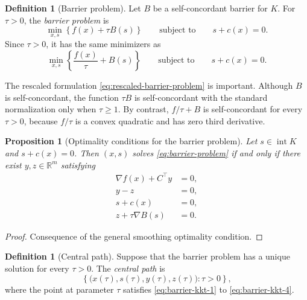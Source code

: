 \documentclass[a4paper,11pt]{book}
\theoremstyle{plain}
\newtheorem{proposition}[theorem]{Proposition}
\theoremstyle{definition}
\newtheorem{definition}[theorem]{Definition}
\theoremstyle{remark}
\numberwithin{equation}{chapter}
\numberwithin{algorithm}{chapter}
\newcommand{\R}{\mathbb{R}}
\newcommand{\intr}{\operatorname{int}}
\begin{document}
	\begin{definition}[Barrier problem]
		Let \(B\) be a self-concordant barrier for \(K\). For \(\tau>0\), the
		\emph{barrier problem} is
		\begin{equation}
			\min_{x,s}
			\left\{
			f(x)+\tau B(s)
			\right\}
			\qquad
			\text{subject to}
			\qquad
			s+c(x)=0.
			\label{eq:barrier-problem}
		\end{equation}
		Since \(\tau>0\), it has the same minimizers as
		\begin{equation}
			\min_{x,s}
			\left\{
			\frac{f(x)}{\tau}+B(s)
			\right\}
			\qquad
			\text{subject to}
			\qquad
			s+c(x)=0.
			\label{eq:rescaled-barrier-problem}
		\end{equation}
	\end{definition}
	
	The rescaled formulation \eqref{eq:rescaled-barrier-problem} is important.
	Although \(B\) is self-concordant, the function \(\tau B\) is
	self-concordant with the standard normalization only when \(\tau\geq1\).
	By contrast, \(f/\tau+B\) is self-concordant for every \(\tau>0\), because
	\(f/\tau\) is a convex quadratic and has zero third derivative.
	
	\begin{proposition}[Optimality conditions for the barrier problem]
		Let \(s\in\intr K\) and \(s+c(x)=0\). Then \((x,s)\) solves
		\eqref{eq:barrier-problem} if and only if there exist \(y,z\in\R^m\)
		satisfying
		\begin{align}
			\nabla f(x)+C^\top y&=0,
			\label{eq:barrier-kkt-1}\\
			y-z&=0,
			\label{eq:barrier-kkt-2}\\
			s+c(x)&=0,
			\label{eq:barrier-kkt-3}\\
			z+\tau\nabla B(s)&=0.
			\label{eq:barrier-kkt-4}
		\end{align}
	\end{proposition}
	\begin{proof}
		Consequence of the general smoothing optimality condition.
	\end{proof}
	
	\begin{definition}[Central path]
		Suppose that the barrier problem has a unique solution for every
		\(\tau>0\). The \emph{central path} is
		\begin{equation}
			\left\{
			\bigl(x(\tau),s(\tau),y(\tau),z(\tau)\bigr):
			\tau>0
			\right\},
		\end{equation}
		where the point at parameter \(\tau\) satisfies
		\eqref{eq:barrier-kkt-1} to \eqref{eq:barrier-kkt-4}.
	\end{definition}
	
\end{document}
